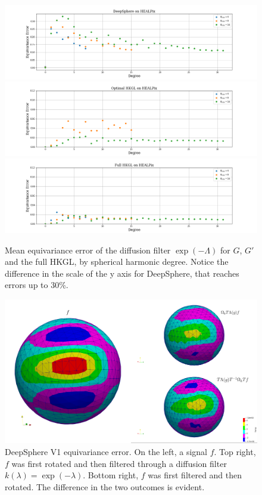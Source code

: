 \begin{figure}[h]
	\centering
	\includegraphics[width=\textwidth]{../codes/06.Equivariance_error/DeepSphereonHEALPix.png}	
	\includegraphics[width=\textwidth]{../codes/06.Equivariance_error/OptimalHKGLonHEALPix.png}	
		\includegraphics[width=\textwidth]{../codes/06.Equivariance_error/FullHKGLonHEALPix.png}	
	\caption{\label{fig:DeepSphere equivariance error}Mean equivariance error of the diffusion filter $\exp(-\Lambda)$ for $G$, $G'$ and the full HKGL, by spherical harmonic degree. Notice the difference in the scale of the y axis for DeepSphere, that reaches errors up to 30\%.}
\end{figure}

\begin{figure}[h!]
	\centering
	\includegraphics[width=\textwidth]{../codes/06.Equivariance_error/img_example_DeepSphere/DS.png}	
	\caption{\label{fig:DeepSphere equivariance error in practice}DeepSphere V1 equivariance error. On the left, a signal $f$. Top right, $f$ was first rotated and then filtered through a diffusion filter $k(\lambda) = \exp (-\lambda)$. Bottom right, $f$ was first filtered and then rotated. The difference in the two outcomes is evident.}
\end{figure}


